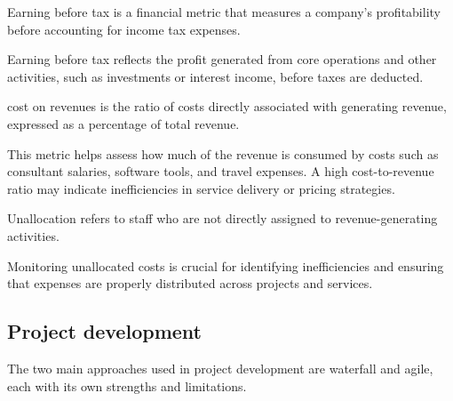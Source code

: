 \begin{definition}
    Earning before tax is a financial metric that measures a company's profitability before accounting for income tax expenses.
\end{definition}
\noindent Earning before tax reflects the profit generated from core operations and other activities, such as investments or interest income, before taxes are deducted.

\begin{definition}
    cost on revenues is the ratio of costs directly associated with generating revenue, expressed as a percentage of total revenue.
\end{definition}
\noindent This metric helps assess how much of the revenue is consumed by costs such as consultant salaries, software tools, and travel expenses. 
A high cost-to-revenue ratio may indicate inefficiencies in service delivery or pricing strategies.

\begin{definition}
    Unallocation refers to staff who are not directly assigned to revenue-generating activities. 
\end{definition}
\noindent Monitoring unallocated costs is crucial for identifying inefficiencies and ensuring that expenses are properly distributed across projects and services.

\subsection{Project development}
The two main approaches used in project development are waterfall and agile, each with its own strengths and limitations.

